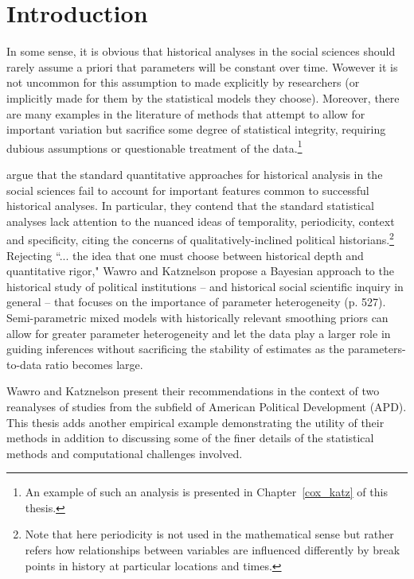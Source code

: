 \chapter{Introduction}
\label{introduction}

In some sense, it is obvious that historical analyses in the social sciences should rarely assume a priori that parameters will be constant over time. Wowever it is not uncommon for this assumption to made explicitly by researchers (or implicitly made for them by the statistical models they choose). Moreover, there are many examples in the literature of methods that attempt to allow for important variation but sacrifice some degree of statistical integrity, requiring dubious assumptions or questionable treatment of the data.\footnote{An example of such an analysis is presented in Chapter~\ref{cox_katz} of this thesis.}  

 argue that the standard quantitative approaches for historical analysis in the social sciences fail to account for important features common to successful historical analyses. In particular, they contend that the standard statistical analyses lack attention to the nuanced ideas of temporality, periodicity, context and specificity, citing the concerns of qualitatively-inclined political historians.\footnote{Note that here periodicity is not used in the mathematical sense but rather refers how relationships between variables are influenced differently by break points in history at particular locations and times.}  Rejecting ``... the idea that one must choose between historical depth and quantitative rigor," Wawro and Katznelson propose a Bayesian approach to the historical study of political institutions -- and historical social scientific inquiry in general --  that focuses on the importance of parameter heterogeneity (p. 527). Semi-parametric mixed models with historically relevant smoothing priors can allow for greater parameter heterogeneity and let the data play a larger role in guiding inferences without sacrificing the stability of estimates as the parameters-to-data ratio becomes large.  

Wawro and Katznelson present their recommendations in the context of two reanalyses of studies from the subfield of American Political Development (APD). This thesis adds another empirical example demonstrating the utility of their methods in addition to discussing some of the finer details of the statistical methods and computational challenges involved. 